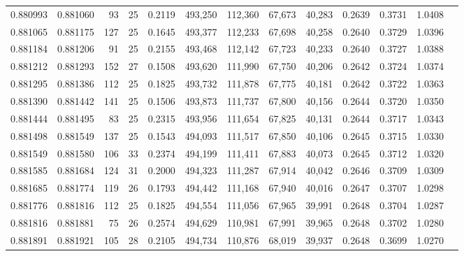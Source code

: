 \begin{tabular}{rrrrrrrrrrrrr}
0.880993 & 0.881060 &    93 &  25 &                                     0.2119 & 493,250 & 112,360 &  67,673 &  40,283 & 0.2639 & 0.3731 & 1.0408 \\
0.881065 & 0.881175 &   127 &  25 &                                     0.1645 & 493,377 & 112,233 &  67,698 &  40,258 & 0.2640 & 0.3729 & 1.0396 \\
0.881184 & 0.881206 &    91 &  25 &                                     0.2155 & 493,468 & 112,142 &  67,723 &  40,233 & 0.2640 & 0.3727 & 1.0388 \\
0.881212 & 0.881293 &   152 &  27 &                                     0.1508 & 493,620 & 111,990 &  67,750 &  40,206 & 0.2642 & 0.3724 & 1.0374 \\
0.881295 & 0.881386 &   112 &  25 &                                     0.1825 & 493,732 & 111,878 &  67,775 &  40,181 & 0.2642 & 0.3722 & 1.0363 \\
0.881390 & 0.881442 &   141 &  25 &                                     0.1506 & 493,873 & 111,737 &  67,800 &  40,156 & 0.2644 & 0.3720 & 1.0350 \\
0.881444 & 0.881495 &    83 &  25 &                                     0.2315 & 493,956 & 111,654 &  67,825 &  40,131 & 0.2644 & 0.3717 & 1.0343 \\
0.881498 & 0.881549 &   137 &  25 &                                     0.1543 & 494,093 & 111,517 &  67,850 &  40,106 & 0.2645 & 0.3715 & 1.0330 \\
0.881549 & 0.881580 &   106 &  33 &                                     0.2374 & 494,199 & 111,411 &  67,883 &  40,073 & 0.2645 & 0.3712 & 1.0320 \\
0.881585 & 0.881684 &   124 &  31 &                                     0.2000 & 494,323 & 111,287 &  67,914 &  40,042 & 0.2646 & 0.3709 & 1.0309 \\
0.881685 & 0.881774 &   119 &  26 &                                     0.1793 & 494,442 & 111,168 &  67,940 &  40,016 & 0.2647 & 0.3707 & 1.0298 \\
0.881776 & 0.881816 &   112 &  25 &                                     0.1825 & 494,554 & 111,056 &  67,965 &  39,991 & 0.2648 & 0.3704 & 1.0287 \\
0.881816 & 0.881881 &    75 &  26 &                                     0.2574 & 494,629 & 110,981 &  67,991 &  39,965 & 0.2648 & 0.3702 & 1.0280 \\
0.881891 & 0.881921 &   105 &  28 &                                     0.2105 & 494,734 & 110,876 &  68,019 &  39,937 & 0.2648 & 0.3699 & 1.0270 \\

\end{tabular}

